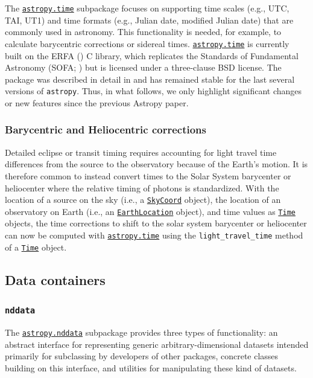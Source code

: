 \documentclass[modern]{aastex62}
\newcommand{\package}[1]{\texttt{#1}\xspace}
\newcommand{\astropy}{Astropy\xspace}
\newcommand{\astropypkg}{\package{astropy}}
\newcommand{\astropysubpkg}[1]{\href{http://docs.astropy.org/en/stable/#1/index.html}{\texttt{astropy.#1}}\xspace}
\newcommand{\astropyskycoord}{\href{http://docs.astropy.org/en/stable/api/astropy.coordinates.SkyCoord.html}{\texttt{SkyCoord}}\xspace}
\newcommand{\astropyTime}{\href{http://docs.astropy.org/en/stable/api/astropy.time.Time.html}{\texttt{Time}}\xspace}
\begin{document}
The \astropysubpkg{time} subpackage focuses on supporting time scales (e.g.,
UTC, TAI, UT1) and time formats (e.g., Julian date, modified Julian date) that
are commonly used in astronomy.
This functionality is needed, for example, to calculate barycentric corrections
or sidereal times.
\astropysubpkg{time} is currently built on the ERFA (\citealt{erfa}) C
library, which replicates the Standards of Fundamental Astronomy (SOFA;
\citealt{sofa}) but is licensed under a three-clause BSD license.
The package was described in detail in  \citet{astropy} and has
remained stable for the last several versions of \astropypkg.
Thus, in what follows, we only highlight significant changes or new features
since the previous \astropy paper.

\subsubsection{Barycentric and Heliocentric corrections}
Detailed eclipse or transit
timing requires accounting for light travel time differences from the
source to the observatory because of the Earth's motion.
It is therefore common to instead convert times to the Solar System
barycenter or heliocenter where the relative timing of photons is
standardized.
With the location of a source on the sky (i.e., a \astropyskycoord
object), the location of an observatory on Earth (i.e., an
\href{http://docs.astropy.org/en/stable/api/astropy.coordinates.EarthLocation.html}{\texttt{EarthLocation}} object), and time values as \astropyTime
objects, the time corrections to shift to the solar system barycenter or
heliocenter can now be computed with \astropysubpkg{time} using the
\texttt{light\_travel\_time} method of a \astropyTime object.

\subsection{Data containers}

\subsubsection{\package{nddata}}

The \astropysubpkg{nddata} subpackage provides three types of functionality: an
abstract interface for representing generic arbitrary-dimensional datasets
intended primarily for subclassing by developers of other packages, concrete
classes building on this interface, and utilities for manipulating these kind of
datasets.
\end{document}
